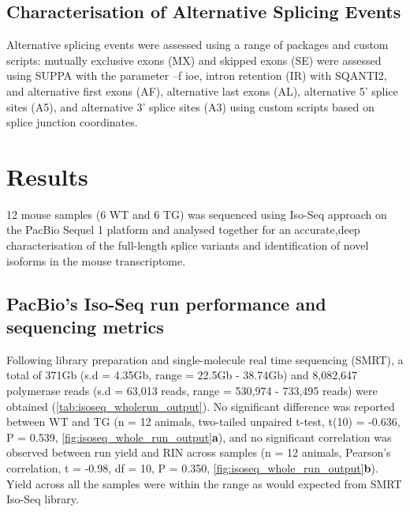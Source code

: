 \subsection{Characterisation of Alternative Splicing Events} 
\label{sec:AS_methods}
Alternative splicing events were assessed using a range of packages and custom scripts: mutually exclusive exons (MX) and skipped exons (SE) were assessed using SUPPA with the parameter –f ioe, intron retention (IR) with SQANTI2, and alternative first exons (AF), alternative last exons (AL), alternative 5’ splice sites (A5), and alternative 3’ splice sites (A3) using custom scripts based on splice junction coordinates. 


\newpage
\section{Results}

12 mouse samples (6 WT and 6 TG) was sequenced using Iso-Seq approach on the PacBio Sequel 1 platform and analysed together for an accurate,deep characterisation of the full-length splice variants and identification of novel isoforms in the mouse transcriptome. 

\subsection{PacBio's Iso-Seq run performance and sequencing metrics}
Following library preparation and single-molecule real time sequencing (SMRT), a total of 371Gb (s.d = 4.35Gb, range = 22.5Gb - 38.74Gb) and 8,082,647 polymerase reads (s.d = 63,013 reads, range = 530,974 - 733,495 reads) were obtained (\cref{tab:isoseq_wholerun_output}). No significant difference was reported between WT and TG (n = 12 animals, two-tailed unpaired t-test, t(10) = -0.636, P = 0.539,  \cref{fig:isoseq_whole_run_output}\textbf{a}), and no significant correlation was observed between run yield and RIN across samples (n = 12 animals, Pearson's correlation, t = -0.98, df = 10, P = 0.350, \cref{fig:isoseq_whole_run_output}\textbf{b}). Yield across all the samples were within the range as would expected from SMRT Iso-Seq library.   


